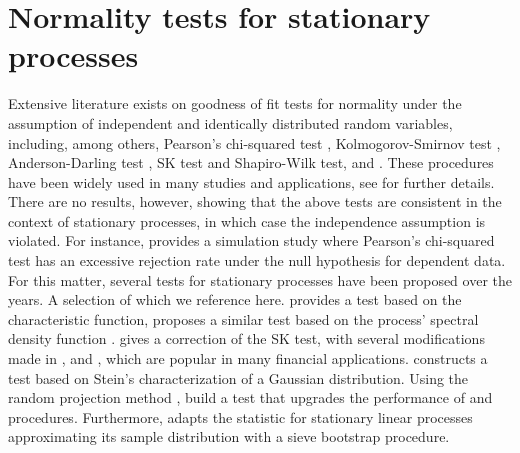 \section{Normality tests for stationary processes}\label{normality-tests-for-stationary-processes}

Extensive literature exists on goodness of fit tests for normality under the assumption of independent and identically distributed random variables, including, among others, Pearson's chi-squared test \citep{Pearson1895}, Kolmogorov-Smirnov test \citep{Smirnov1948}, Anderson-Darling test \citep{anderson1952}, SK test \citep{jarque1980} and Shapiro-Wilk test, \citep{SWtest1965} and \citep{Royston1982}. These procedures have been widely used in many studies and applications, see \citet{Dagostino1987} for further details. There are no results, however, showing that the above tests are consistent in the context of stationary processes, in which case the independence assumption is violated. For instance, \citet{Gasser1975} provides a simulation study where Pearson's chi-squared test has an excessive rejection rate under the null hypothesis for dependent data. For this matter, several tests for stationary processes have been proposed over the years. A selection of which we reference here. \citet{epps1987} provides a test based on the characteristic function, \citet{Hinich1982} proposes a similar test based on the process' spectral density function \citep[for further insight]{Berg2010}. \citet{Gasser1975} gives a correction of the SK test, with several modifications made in \citet{Lobato2004}, \citet{bai2005} and \citet{MarianZach2017}, which are popular in many financial applications. \citet{Meddahi2005} constructs a test based on Stein's characterization of a Gaussian distribution. Using the random projection method \citep{Cuesta2007}, \citet{nietoreyes2014} build a test that upgrades the performance of \citet{epps1987} and \citet{Lobato2004} procedures. Furthermore, \citet{vavra2017} adapts the \citet{anderson1952} statistic for stationary linear processes approximating its sample distribution with a sieve bootstrap procedure.

